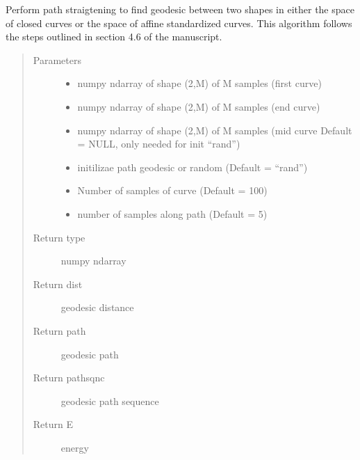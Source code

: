 \documentclass[letterpaper,10pt,english]{sphinxmanual}
\begin{document}

\begin{fulllineitems}
\label{\detokenize{geodesic:geodesic.path_straightening}}
Perform path straigtening to find geodesic between two shapes in either
the space of closed curves or the space of affine standardized curves.
This algorithm follows the steps outlined in section 4.6 of the
manuscript.
\begin{quote}\begin{description}
\item[{Parameters}] \leavevmode\begin{itemize}
\item {} 
 \textendash{} numpy ndarray of shape (2,M) of M samples (first curve)

\item {} 
 \textendash{} numpy ndarray of shape (2,M) of M samples (end curve)

\item {} 
 \textendash{} numpy ndarray of shape (2,M) of M samples (mid curve
Default = NULL, only needed for init “rand”)

\item {} 
 \textendash{} initilizae path geodesic or random (Default = “rand”)

\item {} 
 \textendash{} Number of samples of curve (Default = 100)

\item {} 
 \textendash{} number of samples along path (Default = 5)

\end{itemize}

\item[{Return type}] \leavevmode
numpy ndarray

\item[{Return dist}] \leavevmode
geodesic distance

\item[{Return path}] \leavevmode
geodesic path

\item[{Return pathsqnc}] \leavevmode
geodesic path sequence

\item[{Return E}] \leavevmode
energy

\end{description}\end{quote}

\end{fulllineitems}
\end{document}
